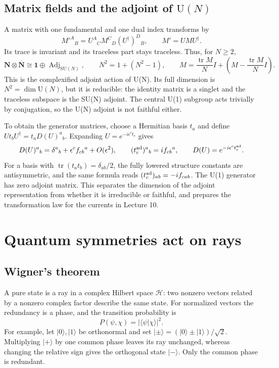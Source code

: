 \documentclass[11pt]{article}
\newcommand{\SU}{\mathrm{SU}}
\newcommand{\UU}{\mathrm{U}}
\newcommand{\tr}{\operatorname{tr}}
\newcommand{\cH}{\mathcal H}
\begin{document}
\subsection{Matrix fields and the adjoint of \texorpdfstring{\(\UU(N)\)}{U(N)}}
A matrix with one fundamental and one dual index transforms by
\begin{equation}
 M'^A{}_B=U^A{}_C M^C{}_D(U^\dagger)^D{}_B,
 \qquad M'=UMU^\dagger.
 \label{eq:matrix-field}
\end{equation}
Its trace is invariant and its traceless part stays traceless. Thus, for
\(N\geq2\),
\begin{equation}
 \bm N\otimes\overline{\bm N}
 \cong\bm1\oplus\operatorname{Adj}_{\SU(N)},\qquad
 N^2=1+(N^2-1),\qquad
 M=\frac{\tr M}{N}I+\left(M-\frac{\tr M}{N}I\right).
 \label{eq:fundamental-antifundamental}
\end{equation}
This is the complexified adjoint action of U(N). Its full dimension is
\(N^2=\dim\UU(N)\), but it is reducible: the identity matrix is a singlet
and the traceless subspace is the SU(N) adjoint. The central U(1) subgroup
acts trivially by conjugation, so the U(N) adjoint is not faithful either.

To obtain the generator matrices, choose a Hermitian basis \(t_a\) and define
\(Ut_bU^\dagger=t_aD(U)^a{}_b\). Expanding
\(U=e^{-i\epsilon^ct_c}\) gives
\begin{equation}
 D(U)^a{}_b=\delta^a{}_b+\epsilon^cf_{cb}{}^a+O(\epsilon^2),
 \qquad (t_c^{\rm ad})^a{}_b=i f_{cb}{}^a,
 \qquad D(U)=e^{-i\epsilon^ct_c^{\rm ad}}.
 \label{eq:adjoint-matrices}
\end{equation}
For a basis with \(\tr(t_at_b)=\delta_{ab}/2\), the fully lowered
structure constants are antisymmetric, and the same formula reads
\((t_c^{\rm ad})_{ab}=-if_{cab}\). The U(1) generator has zero adjoint
matrix. This separates the dimension of the adjoint representation from
whether it is irreducible or faithful, and prepares the transformation
law for the currents in Lecture 10.

\section{Quantum symmetries act on rays}
\label{sec:rays}
\subsection{Wigner's theorem}
A pure state is a ray in a complex Hilbert space \(\cH\): two nonzero
vectors related by a nonzero complex factor describe the same state.
For normalized vectors the redundancy is a phase, and the transition
probability is
\[
 P(\psi,\chi)=|\langle\psi|\chi\rangle|^2.
\]
For example, let \(\lvert0\rangle,\lvert1\rangle\) be orthonormal and set
\(\lvert\pm\rangle=(\lvert0\rangle\pm\lvert1\rangle)/\sqrt2\).
Multiplying \(\lvert+\rangle\) by one common phase leaves its ray
unchanged, whereas changing the relative sign gives the orthogonal
state \(\lvert-\rangle\). Only the common phase is redundant.
\end{document}
